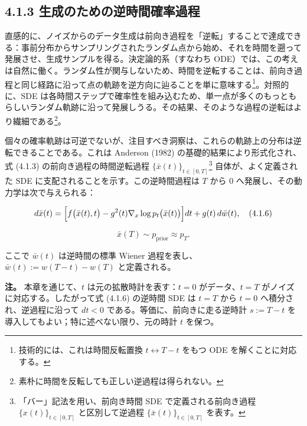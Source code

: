 \subsection*{4.1.3 生成のための逆時間確率過程}




直感的に、ノイズからのデータ生成は前向き過程を「逆転」することで達成できる：事前分布からサンプリングされたランダム点から始め、それを時間を遡って発展させ、生成サンプルを得る。決定論的系（すなわち ODE）では、この考えは自然に働く。ランダム性が関与しないため、時間を逆転することは、前向き過程と同じ経路に沿って点の軌跡を逆方向に辿ることを単に意味する\footnote{技術的には、これは時間反転置換 $t\leftrightarrow T-t$ をもつ ODE を解くことに対応する。}。対照的に、SDE は各時間ステップで確率性を組み込むため、単一点が多くのもっともらしいランダム軌跡に沿って発展しうる。その結果、そのような過程の逆転はより繊細である\footnote{素朴に時間を反転しても正しい逆過程は得られない。}。

個々の確率軌跡は可逆でないが、注目すべき洞察は、これらの軌跡上の分布は逆転できることである。これは Anderson (1982) の基礎的結果により形式化され、式 (4.1.3) の前向き過程の時間逆転過程 $\{\bar{x}(t)\}_{t\in[0,T]}$\footnote{「バー」記法を用い、前向き時間 SDE で定義される前向き過程 $\{x(t)\}_{t\in[0,T]}$ と区別して逆過程 $\{\bar{x}(t)\}_{t\in[0,T]}$ を表す。} 自体が、よく定義された SDE に支配されることを示す。この逆時間過程は $T$ から $0$ へ発展し、その動力学は次で与えられる：

\[
d\bar{x}(t)=\Bigl[f\bigl(\bar{x}(t),t\bigr)-g^2(t)\nabla_x\log p_t\bigl(\bar{x}(t)\bigr)\Bigr]dt + g(t)\, d\bar{w}(t), \quad (4.1.6)
\]


\[
\bar{x}(T)\sim p_{\mathrm{prior}}\approx p_T.
\]


ここで $\bar{w}(t)$ は逆時間の標準 Wiener 過程を表し、$\bar{w}(t):=w(T-t)-w(T)$ と定義される。

\textbf{注。}
本章を通じて、$t$ は元の拡散時計を表す：$t=0$ がデータ、$t=T$ がノイズに対応する。したがって式 (4.1.6) の逆時間 SDE は $t=T$ から $t=0$ へ積分され、逆過程に沿って $dt<0$ である。等価に、前向きに走る逆時計 $s:=T-t$ を導入してもよい；特に述べない限り、元の時計 $t$ を保つ。

